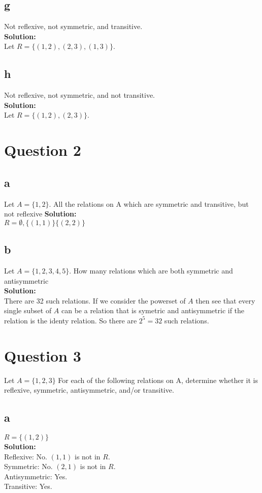\documentclass{article}
\begin{document}
\subsection*{g}
Not reflexive, not symmetric, and transitive.\\
\textbf{Solution:}\\
Let $R = \{(1,2), (2,3), (1,3)\}$.
\subsection*{h}
Not reflexive, not symmetric, and not transitive.\\
\textbf{Solution:}\\
Let $R = \{(1,2), (2,3)\}$.

\section*{Question 2}
\subsection*{a}
Let $A= \{ 1,2\}$. All the relations on A which are symmetric and transitive, but not reflexive
\textbf{Solution:}\\
$R = \emptyset, \{(1,1) \} \{(2,2) \}$
\subsection*{b}
Let $A= \{ 1,2,3,4,5\}$. How many relations which are both symmetric and antisymmetric \\
\textbf{Solution:}\\ 
There are 32 such relations. If we consider the powerset of $A$ then see that every single subset of $A$ can be a relation that is symetric and antisymmetric if the relation is the identy relation. So there are $2^5 = 32$ such relations.
\section*{Question 3}
Let $A = \{1,2,3\}$ For each of the following relations on A, determine whether it is reflexive, symmetric, antisymmetric, and/or transitive.
\subsection*{a}
$R = \{(1,2)\}$\\
\textbf{Solution:}\\
Reflexive: No. $(1,1)$ is not in $R$.\\
Symmetric: No. $(2,1)$ is not in $R$.\\
Antisymmetric: Yes. \\
Transitive: Yes. 
\end{document}
